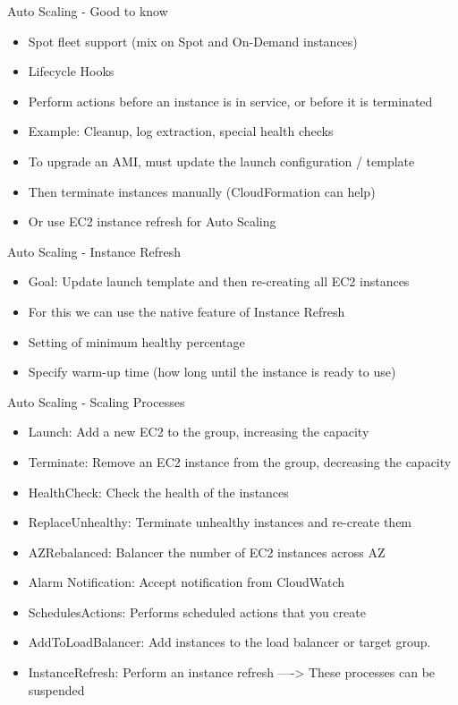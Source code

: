 Auto Scaling - Good to know
\begin{itemize}
    \item Spot fleet support (mix on Spot and On-Demand instances)
    \item Lifecycle Hooks
    \item Perform actions before an instance is in service, or before it is terminated
    \item Example: Cleanup, log extraction, special health checks
    \item To upgrade an AMI, must update the launch configuration / template
    \item Then terminate instances manually (CloudFormation can help)
    \item Or use EC2 instance refresh for Auto Scaling
\end{itemize}

Auto Scaling - Instance Refresh
\begin{itemize}
    \item Goal: Update launch template and then re-creating all EC2 instances
    \item For this we can use the native feature of Instance Refresh
    \item Setting of minimum healthy percentage
    \item Specify warm-up time (how long until the instance is ready to use)
\end{itemize}

Auto Scaling - Scaling Processes
\begin{itemize}
    \item Launch: Add a new EC2 to the group, increasing the capacity
    \item Terminate: Remove an EC2 instance from the group, decreasing the capacity
    \item HealthCheck: Check the health of the instances
    \item ReplaceUnhealthy: Terminate unhealthy instances and re-create them
    \item AZRebalanced: Balancer the number of EC2 instances across AZ
    \item Alarm Notification: Accept notification from CloudWatch
    \item SchedulesActions: Performs scheduled actions that you create
    \item AddToLoadBalancer: Add instances to the load balancer or target group.
    \item InstanceRefresh: Perform an instance refresh
    ----> These processes can be suspended
\end{itemize}

